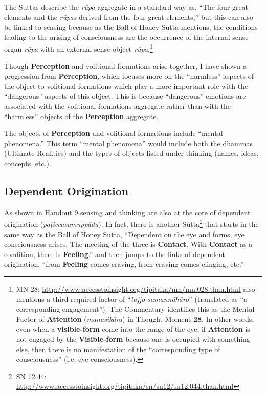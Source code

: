 The Suttas describe the \textit{rūpa} aggregate in a standard way as, “The four great elements and the \textit{rūpas} derived from the four great elements,” but this can also be linked to sensing because as the Ball of Honey Sutta mentions, the conditions leading to the arising of consciousness are the occurrence of the internal sense organ \textit{rūpa} with an external sense object \textit{rūpa}.\footnote{MN 28: \url{http://www.accesstoinsight.org/tipitaka/mn/mn.028.than.html} also mentions a third required factor of “\textit{tajjo samannāhāro}” (translated as “a corresponding engagement”). The Commentary identifies this as the Mental Factor of \textbf{Attention} (\textit{manasikāra}) in Thought Moment \textbf{28}. In other words, even when a \textbf{visible-form} come into the range of the eye, if \textbf{Attention} is not engaged by the \textbf{Visible-form} because one is occupied with something else, then there is no manifestation of the “corresponding type of consciousness” (i.e. eye-consciousness).}

Though \textbf{Perception} and volitional formations arise together, I have shown a progression from \textbf{Perception}, which focuses more on the “harmless” aspects of the object to volitional formations which play a more important role with the “dangerous” aspects of this object. This is because “dangerous” emotions are associated with the volitional formations aggregate rather than with the “harmless” objects of the \textbf{Perception} aggregate.

The objects of \textbf{Perception} and volitional formations include “mental phenomena.” This term “mental phenomena” would include both the dhammas (Ultimate Realities) and the types of objects listed under thinking (names, ideas, concepts, etc.).

\subsection*{Dependent Origination}

As shown in Handout 9 sensing and thinking are also at the core of dependent origination (\textit{paṭiccasamuppāda}). In fact, there is another Sutta\footnote{SN 12.44: \url{http://www.accesstoinsight.org/tipitaka/sn/sn12/sn12.044.than.html}} that starts in the same way as the Ball of Honey Sutta, “Dependent on the eye and forms, eye consciousness arises. The meeting of the three is \textbf{Contact}. With \textbf{Contact} as a condition, there is \textbf{Feeling}.” and then jumps to the links of dependent origination, “from \textbf{Feeling} comes craving, from craving comes clinging, etc.”

